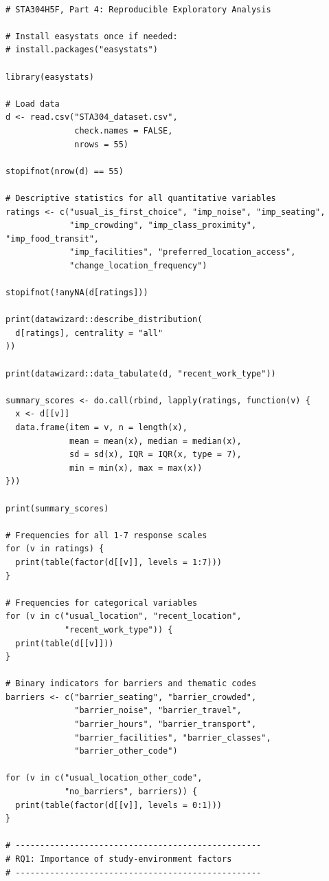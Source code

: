 \documentclass[11pt,letterpaper]{article}
\begin{document}
\begin{lstlisting}[style=rsource]

# STA304H5F, Part 4: Reproducible Exploratory Analysis

# Install easystats once if needed:
# install.packages("easystats")

library(easystats)

# Load data
d <- read.csv("STA304_dataset.csv",
              check.names = FALSE,
              nrows = 55)

stopifnot(nrow(d) == 55)

# Descriptive statistics for all quantitative variables
ratings <- c("usual_is_first_choice", "imp_noise", "imp_seating",
             "imp_crowding", "imp_class_proximity", "imp_food_transit",
             "imp_facilities", "preferred_location_access",
             "change_location_frequency")

stopifnot(!anyNA(d[ratings]))

print(datawizard::describe_distribution(
  d[ratings], centrality = "all"
))

print(datawizard::data_tabulate(d, "recent_work_type"))

summary_scores <- do.call(rbind, lapply(ratings, function(v) {
  x <- d[[v]]
  data.frame(item = v, n = length(x),
             mean = mean(x), median = median(x),
             sd = sd(x), IQR = IQR(x, type = 7),
             min = min(x), max = max(x))
}))

print(summary_scores)

# Frequencies for all 1-7 response scales
for (v in ratings) {
  print(table(factor(d[[v]], levels = 1:7)))
}

# Frequencies for categorical variables
for (v in c("usual_location", "recent_location",
            "recent_work_type")) {
  print(table(d[[v]]))
}

# Binary indicators for barriers and thematic codes
barriers <- c("barrier_seating", "barrier_crowded",
              "barrier_noise", "barrier_travel",
              "barrier_hours", "barrier_transport",
              "barrier_facilities", "barrier_classes",
              "barrier_other_code")

for (v in c("usual_location_other_code",
            "no_barriers", barriers)) {
  print(table(factor(d[[v]], levels = 0:1)))
}

# --------------------------------------------------
# RQ1: Importance of study-environment factors
# --------------------------------------------------


\end{lstlisting}
\end{document}
